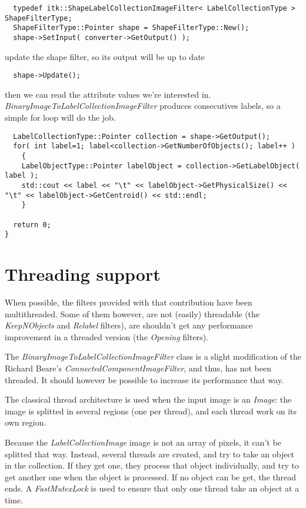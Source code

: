 \documentclass{InsightArticle}
\begin{document}
\small \begin{verbatim}
  typedef itk::ShapeLabelCollectionImageFilter< LabelCollectionType > ShapeFilterType;
  ShapeFilterType::Pointer shape = ShapeFilterType::New();
  shape->SetInput( converter->GetOutput() );

\end{verbatim} \normalsize
update the shape filter, so its output will be up to date
\small \begin{verbatim}
  shape->Update();

\end{verbatim} \normalsize
then we can read the attribute values we're interested in. {\em BinaryImageToLabelCollectionImageFilter}
produces consecutives labels, so a simple {for} loop will do the job.
\small \begin{verbatim}
  LabelCollectionType::Pointer collection = shape->GetOutput();
  for( int label=1; label<collection->GetNumberOfObjects(); label++ )
    {
    LabelObjectType::Pointer labelObject = collection->GetLabelObject( label );
    std::cout << label << "\t" << labelObject->GetPhysicalSize() << "\t" << labelObject->GetCentroid() << std::endl;
    }
  
  return 0;
}
\end{verbatim} \normalsize


\section{Threading support}

When possible, the filters provided with that contribution have been multithreaded.
Some of them however, are not (easily) threadable (the {\em KeepNObjects} and {\em Relabel}
filters), are shouldn't get any performance improvement in a threaded version
(the {\em Opening} filters).

The {\em BinaryImageToLabelCollectionImageFilter} class is a slight modification of the
Richard Beare's {\em ConnectedComponentImageFilter}, and thus, has not been threaded.
It should however be possible to increase its performance that way.

The classical thread architecture is used when the input image is an {\em Image}: the image
is splitted in several regions (one per thread), and each thread work on its own region.

Because the {\em LabelCollectionImage} image is not an array of pixels, it can't be splitted
that way. Instead, several threads are created, and try to take an object in the collection.
If they get one, they process that object individually, and try to get another one when the
object is processed. If no object can be get, the thread ends. A {\em FastMutexLock} is used
to ensure that only one thread take an object at a time.
\end{document}

